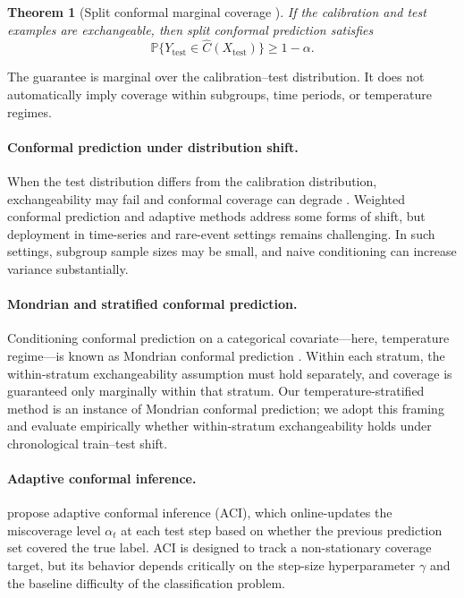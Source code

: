 \documentclass{article}
\newtheorem{theorem}{Theorem}
\newcommand{\test}{\mathrm{test}}
\begin{document}
\begin{theorem}[Split conformal marginal coverage \citep{angelopoulos2023}]
If the calibration and test examples are exchangeable, then split conformal
prediction satisfies
\begin{equation}
    \mathbb{P}\{Y_{\test} \in \hat{C}(X_{\test})\} \geq 1-\alpha.
\end{equation}
\end{theorem}

The guarantee is marginal over the calibration--test distribution. It does
not automatically imply coverage within subgroups, time periods, or
temperature regimes.

\paragraph{Conformal prediction under distribution shift.}
When the test distribution differs from the calibration distribution,
exchangeability may fail and conformal coverage can degrade
\citep{tibshirani2019,barber2023}. Weighted conformal prediction
\citep{tibshirani2019} and adaptive methods \citep{gibbs2021} address some
forms of shift, but deployment in time-series and rare-event settings remains
challenging. In such settings, subgroup sample sizes may be small, and naive
conditioning can increase variance substantially.

\paragraph{Mondrian and stratified conformal prediction.}
Conditioning conformal prediction on a categorical covariate---here,
temperature regime---is known as Mondrian conformal prediction
\citep{vovk2005,johansson2014}. Within each stratum, the within-stratum
exchangeability assumption must hold separately, and coverage is guaranteed
only marginally within that stratum. Our temperature-stratified method is
an instance of Mondrian conformal prediction; we adopt this framing and
evaluate empirically whether within-stratum exchangeability holds under
chronological train--test shift.

\paragraph{Adaptive conformal inference.}
\citet{gibbs2021} propose adaptive conformal inference (ACI), which
online-updates the miscoverage level $\alpha_t$ at each test step based on
whether the previous prediction set covered the true label. ACI is designed
to track a non-stationary coverage target, but its behavior depends critically
on the step-size hyperparameter $\gamma$ and the baseline difficulty of the
classification problem.
\end{document}
